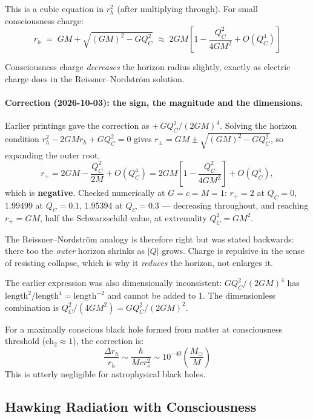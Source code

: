 This is a cubic equation in $r_h^2$ (after multiplying through). For small consciousness charge:
\begin{equation}
r_h \;=\; GM + \sqrt{(GM)^2 - GQ_C^2}
\;\approx\; 2GM\left[ 1 - \frac{Q_C^2}{4GM^2} + O(Q_C^4) \right]
\end{equation}

\begin{keyidea}
Consciousness charge \textit{decreases} the horizon radius slightly, exactly as
electric charge does in the Reissner--Nordstr\"om solution.

\paragraph{Correction (2026-10-03): the sign, the magnitude and the dimensions.}
Earlier printings gave the correction as $+\,GQ_C^2/(2GM)^4$. Solving the horizon
condition $r_h^2 - 2GMr_h + GQ_C^2 = 0$ gives
$r_\pm = GM \pm \sqrt{(GM)^2 - GQ_C^2}$, so expanding the outer root,
\[
r_+ = 2GM - \frac{Q_C^2}{2M} + O(Q_C^4)
   = 2GM\left[1 - \frac{Q_C^2}{4GM^2}\right] + O(Q_C^4),
\]
which is \textbf{negative}. Checked numerically at $G = c = M = 1$: $r_+ = 2$ at
$Q_C = 0$, $1.99499$ at $Q_C = 0.1$, $1.95394$ at $Q_C = 0.3$ --- decreasing
throughout, and reaching $r_+ = GM$, half the Schwarzschild value, at extremality
$Q_C^2 = GM^2$.

The Reissner--Nordstr\"om analogy is therefore right but was stated backwards:
there too the \emph{outer} horizon shrinks as $|Q|$ grows. Charge is repulsive in
the sense of resisting collapse, which is why it \emph{reduces} the horizon, not
enlarges it.

The earlier expression was also dimensionally inconsistent:
$GQ_C^2/(2GM)^4$ has $\mathrm{length}^2/\mathrm{length}^4 = \mathrm{length}^{-2}$
and cannot be added to $1$. The dimensionless combination is
$Q_C^2/(4GM^2) = GQ_C^2/(2GM)^2$.

For a maximally conscious black hole formed from matter at consciousness threshold ($\text{ch}_2 \approx 1$), the correction is:
\begin{equation}
\frac{\Delta r_h}{r_h} \sim \frac{\hbar}{M c r_s^2} \sim 10^{-40} \left( \frac{M_\odot}{M} \right)
\end{equation}
This is utterly negligible for astrophysical black holes.
\end{keyidea}

\subsection{Hawking Radiation with Consciousness}

